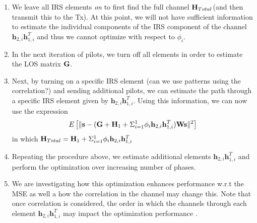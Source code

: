 \documentclass[12pt,a4paper]{report}
\begin{document}
\begin{enumerate}
\item
We leave all IRS elements \emph{on} to first find the full channel   $\mathbf{H}_{Total}$(and then transmit this to the Tx). At this point, we will not have sufficient information to estimate the individual components of the IRS component of the channel $\mathbf{h}_{2,i}\mathbf{h}^T_{1,i}$ and thus we cannot optimize with respect to $\phi_i $.
\item
	In the next iteration of pilots, we turn off all elements in order to estimate the LOS matrix $\mathbf{G} $.
\item
	Next, by turning on a specific IRS element (can we use patterns using the correlation?) and sending additional pilots, we can estimate 
	the path through a specific IRS element given by $\mathbf{h}_{2,i}\mathbf{h}^T_{1,i}$.
	Using this information, we can now use the expression 
	\begin{equation}
E\left[\|  \mathbf{s} - (\mathbf{G} +  \mathbf{H}_1 + \Sigma_{i=1}^{1} \phi_i \mathbf{h}_{2,i}\mathbf{h}^T_{1,i})\mathbf{W}\mathbf{s}  \|^2 \right]
\end{equation}
in which $\mathbf{H}_{Total} =  \mathbf{H}_1 + \Sigma_{i=1}^{1} \phi_i \mathbf{h}_{2,i}\mathbf{h}^T_{1,i}$
	\item
		Repeating the procedure above, we estimate additional elements $\mathbf{h}_{2,i}\mathbf{h}^T_{1,i}$ and perform the optimization over increasing number of phases.
	\item 
		We are investigating how this optimization enhances performance w.r.t the MSE as well a how the correlation in the channel may change this. 
		Note that once correlation is considered, the order in which the channels through each element $\mathbf{h}_{2,i}\mathbf{h}^T_{1,i}$ may impact the optimization performance .
\end{enumerate}
\end{document}
